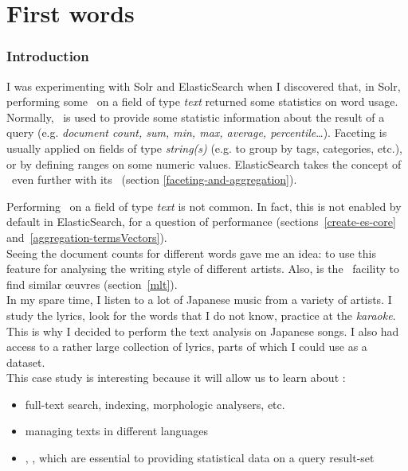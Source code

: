 
\renewcommand{\currentPart}{First words}
\part{\currentPart}


\section{Introduction}

I was experimenting with Solr and ElasticSearch when I discovered that, in Solr, performing some \faceting\ on a field of type \emph{text} returned some statistics on word usage. \\

Normally, \faceting\ is used to provide some statistic information about the result of a query (e.g. \emph{document count, sum, min, max, average, percentile}\dots). Faceting is usually applied on fields of type \emph{string(s)} (e.g. to group by tags, categories, etc.), or by defining ranges on some numeric values. ElasticSearch takes the concept of \faceting\ even further with its \aggregations\ (section \ref{faceting-and-aggregation}).


Performing \faceting\ on a field of type \emph{text} is not common. In fact, this is not enabled by default in ElasticSearch, for a question of performance (sections~\ref{create-es-core} and~\ref{aggregation-termsVectors}).
\\


Seeing the document counts for different words gave me an idea: to use this feature for analysing the writing style of different artists. Also, is the \MLT\ facility to find similar \oe uvres (section~\ref{mlt}).
\\

In my spare time, I listen to a lot of Japanese music from a variety of artists. I study the lyrics, look for the words that I do not know, practice at the \emph{karaoke}.
This is why I decided to perform the text analysis on Japanese songs. I also had access to a rather large collection of lyrics, parts of which I could use as a dataset. \\

This case study is interesting because it will allow us to learn about :
\begin{itemize}
	\item full-text search, indexing, morphologic analysers, etc.
	
	\item managing texts in different languages
	
	\item \faceting, \aggregation, which are essential to providing statistical data on a query result-set
\end{itemize}



